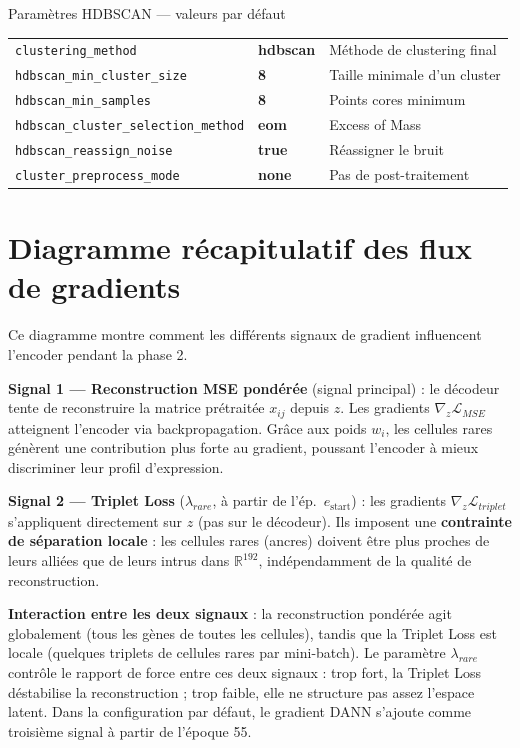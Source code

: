 \documentclass[11pt,a4paper]{article}
\begin{document}
\begin{parambox}{Param\`etres HDBSCAN --- valeurs par d\'efaut}
\begin{tabular}{lll}
\texttt{clustering\_method} & \textbf{hdbscan} & M\'ethode de clustering final \\
\texttt{hdbscan\_min\_cluster\_size} & \textbf{8} & Taille minimale d'un cluster \\
\texttt{hdbscan\_min\_samples} & \textbf{8} & Points cores minimum \\
\texttt{hdbscan\_cluster\_selection\_method} & \textbf{eom} & Excess of Mass \\
\texttt{hdbscan\_reassign\_noise} & \textbf{true} & R\'eassigner le bruit \\
\texttt{cluster\_preprocess\_mode} & \textbf{none} & Pas de post-traitement \\
\end{tabular}
\end{parambox}

\section{Diagramme r\'ecapitulatif des flux de gradients}
\label{sec:gradient_flow}

Ce diagramme montre comment les diff\'erents signaux de gradient influencent l'encoder pendant la phase 2.

\textbf{Signal 1 --- Reconstruction MSE pond\'er\'ee} (signal principal) : le d\'ecodeur tente de reconstruire la matrice pr\'etrait\'ee $x_{ij}$ depuis $z$. Les gradients $\nabla_z \mathcal{L}_{MSE}$ atteignent l'encoder via backpropagation. Gr\^ace aux poids $w_i$, les cellules rares g\'en\`erent une contribution plus forte au gradient, poussant l'encoder \`a mieux discriminer leur profil d'expression.

\textbf{Signal 2 --- Triplet Loss} ($\lambda_{rare}$, \`a partir de l'\'ep.~$e_{\text{start}}$) : les gradients $\nabla_z \mathcal{L}_{triplet}$ s'appliquent directement sur $z$ (pas sur le d\'ecodeur). Ils imposent une \textbf{contrainte de s\'eparation locale} : les cellules rares (ancres) doivent \^etre plus proches de leurs alli\'ees que de leurs intrus dans $\mathbb{R}^{192}$, ind\'ependamment de la qualit\'e de reconstruction.

\textbf{Interaction entre les deux signaux} : la reconstruction pond\'er\'ee agit globalement (tous les g\`enes de toutes les cellules), tandis que la Triplet Loss est locale (quelques triplets de cellules rares par mini-batch). Le param\`etre $\lambda_{rare}$ contr\^ole le rapport de force entre ces deux signaux : trop fort, la Triplet Loss d\'estabilise la reconstruction ; trop faible, elle ne structure pas assez l'espace latent. Dans la configuration par d\'efaut, le gradient DANN s'ajoute comme troisi\`eme signal \`a partir de l'\'epoque 55.
\end{document}
